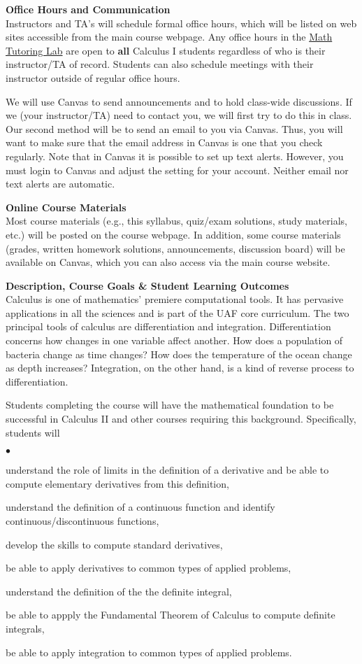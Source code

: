 \documentclass[12pt]{article}
\renewcommand{\emph}[1]{\textsf{\textbf{#1}}}
\newcommand{\localhead}[1]{\par\smallskip\textbf{#1}\nobreak\\}%
\def\heading#1{\localhead{\large\emph{#1}}}
\newenvironment{clist}%
{\bgroup\parskip 0pt\begin{list}{$\bullet$}{\partopsep 4pt\topsep 0pt\itemsep -2pt}}%
{\end{list}\egroup}%
\begin{document}
\heading{Office Hours and Communication}
Instructors and TA's will schedule formal office hours,
which will be listed on web sites accessible from the main
course webpage. Any office hours in the \href{https://uaf.edu/dms/mathlab/}{Math Tutoring Lab} are open to \emph{all} Calculus I students regardless of who is their instructor/TA of record. Students can also schedule meetings with their instructor outside of regular office hours. 

We will use Canvas to send announcements and to hold class-wide discussions. If we (your instructor/TA) need to contact you, we will first try to do this in class. Our second method will be to send an email to you via Canvas. Thus, you will want to make sure that the email address in Canvas is one that you check regularly. Note that in Canvas it is possible to set up text alerts. However, you must login to Canvas and adjust the setting for your account. Neither email nor text alerts are automatic.


\heading{Online Course Materials}
Most course materials (e.g., this syllabus, quiz/exam solutions, study materials, etc.) will be posted on the course webpage.
In addition, some course materials (grades, written homework solutions, announcements, discussion board)
will be available on Canvas, which you can also access via the main
course website.

\heading{Description, Course Goals \& Student Learning Outcomes}
Calculus is one of mathematics' premiere computational tools.  It has
pervasive applications in all the sciences and is part of the UAF core 
curriculum.  The two principal tools of calculus are differentiation and integration. Differentiation concerns how changes in one variable affect another.
How does a population of bacteria change as time changes?  
How does the temperature of the ocean change as depth increases?
Integration, on the other hand, is a kind of reverse process to
differentiation. 

Students completing the course will have the mathematical foundation to be successful in Calculus II and other courses
requiring this background.  Specifically, students will
\begin{clist}
\item understand the role of limits in the definition of a derivative 
and be able to compute elementary derivatives from this definition,
\item understand the definition of a continuous function and identify
continuous/discontinuous functions,
\item develop the skills to compute standard derivatives,
\item be able to apply derivatives to common types of applied problems,
\item understand the definition of the the definite integral,
\item be able to appply the Fundamental Theorem of Calculus to
compute definite integrals,
\item be able to apply integration to common types of applied problems.
\end{clist}
\end{document}
